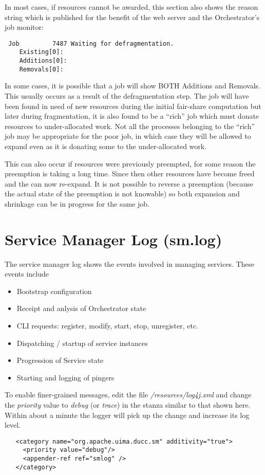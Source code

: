       In most cases, if resources cannot be awarded, this section also shows the reason 
      string which is published for the benefit of the web server and the Orchestrator's job monitor:
\begin{verbatim}
 Job         7487 Waiting for defragmentation.
	Existing[0]: 
	Additions[0]: 
	Removals[0]: 
\end{verbatim}

     In some cases, it is possible that a job will show BOTH Additions and Removals.  This usually
     occurs as a result of the defragmentation step.  The job will have been found in need of
     new resources during the initial fair-share computation but later during fragmentation,
     it is also found to be a ``rich'' job which must donate resources to under-allocated work.
     Not all the processes belonging to the ``rich'' job may be appropriate for the poor job,
     in which case they will be allowed to expand even as it is donating some to the
     under-allocated work.

     This can also occur if resources were previously preempted, for some reason the
     preemption is taking a long time.  Since then other resources have become freed and
     the can now re-expand.  It is not possible to reverse a preemption (because the actual
     state of the preemption is not knowable) so both expansion and shrinkage can be
     in progress for the same job.

\section{Service  Manager Log (sm.log)}

   The service manager log shows the events involved in managing services.  These events include
   \begin{itemize}
     \item Bootstrap configuration
     \item Receipt and anlysis of Orchestrator state
     \item CLI requests: register, modify, start, stop, unregister, etc.
     \item Dispatching / startup of service instances
     \item Progression of Service state
     \item Starting and logging of pingers
   \end{itemize}

    To enable finer-grained messages, edit the file 
    {\em  \ducchome/resources/log4j.xml}
    and change the {\em priority} value to {\em debug} (or {\em trace}) in the stanza
    similar to that shown here.  Within about a minute the logger will
    pick up the change and increase its log level.
\begin{verbatim}
   <category name="org.apache.uima.ducc.sm" additivity="true">
     <priority value="debug"/>
     <appender-ref ref="smlog" /> 
   </category>
\end{verbatim}

